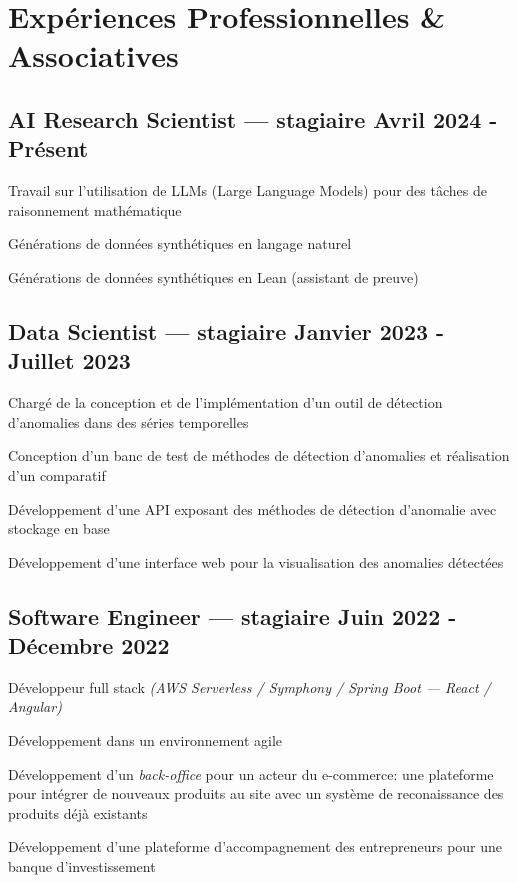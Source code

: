 \section{Expériences Professionnelles \& Associatives}
\vspace{0.1cm}

\subsection{{AI Research Scientist --- stagiaire \hfill Avril 2024 - Présent}}
\begin{zitemize}
    \item Travail sur l'utilisation de LLMs (Large Language Models) pour des tâches de raisonnement mathématique
    \item Générations de données synthétiques en langage naturel
    \item Générations de données synthétiques en Lean (assistant de preuve)
\end{zitemize}
\vspace{0.1cm}

\subsection{{Data Scientist --- stagiaire \hfill Janvier 2023 - Juillet 2023}}
\begin{zitemize}
    \item Chargé de la conception et de l'implémentation d'un outil de détection d'anomalies dans des séries temporelles
    \item Conception d'un banc de test de méthodes de détection d'anomalies et réalisation d'un comparatif
    \item Développement d'une API exposant des méthodes de détection d'anomalie avec stockage en base
    \item Développement d'une interface web pour la visualisation des anomalies détectées
\end{zitemize}
\vspace{0.1cm}

\subsection{{Software Engineer --- stagiaire \hfill Juin 2022 - Décembre 2022}}
\begin{zitemize}
    \item Développeur full stack \textit{(AWS Serverless / Symphony / Spring Boot --- React / Angular)}
    \item Développement dans un environnement agile
    \item Développement d'un \textit{back-office} pour un acteur du e-commerce: une plateforme pour intégrer de nouveaux produits au site avec un système de reconaissance des produits déjà existants
    \item Développement d'une plateforme d'accompagnement des entrepreneurs pour une banque d'investissement
\end{zitemize}
\vspace{0.1cm}

